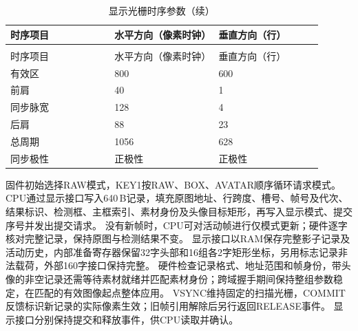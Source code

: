 \begin{reporttable}
\begin{longtable}{@{}p{0.30\linewidth}p{0.30\linewidth}p{0.30\linewidth}@{}}
\caption{显示光栅时序参数}\label{tbl:video-output-timing}\\
\toprule
时序项目 & 水平方向（像素时钟） & 垂直方向（行） \\
\midrule
\endfirsthead
\caption[]{显示光栅时序参数（续）}\\
\toprule
时序项目 & 水平方向（像素时钟） & 垂直方向（行） \\
\midrule
\endhead
\bottomrule
\endfoot
有效区 & 800 & 600 \\
前肩 & 40 & 1 \\
同步脉宽 & 128 & 4 \\
后肩 & 88 & 23 \\
总周期 & 1056 & 628 \\
同步极性 & 正极性 & 正极性 \\
\end{longtable}
\end{reporttable}

固件初始选择RAW模式，KEY1按RAW、BOX、AVATAR顺序循环请求模式。
CPU通过显示接口写入640\,B记录，填充原图地址、行跨度、槽号、帧号及代次、结果标识、检测框、主框索引、素材身份及头像目标矩形，再写入显示模式、提交序号并发出提交请求。
没有新帧时，CPU可对活动帧进行仅模式更新；硬件逐字核对完整记录，保持原图与检测结果不变。
显示接口以RAM保存完整影子记录及活动历史，内部准备寄存器保留32字头部和16组各2字矩形坐标，另用标志记录非法载荷，外部160字接口保持完整。
硬件检查记录格式、地址范围和帧身份，带头像的非空记录还需等待素材就绪并匹配素材身份；跨域握手期间保持整组参数稳定，在匹配的有效图像起点整体应用。
VSYNC维持固定的扫描光栅，COMMIT反馈标识新记录的实际像素生效；旧帧引用解除后另行返回RELEASE事件。
显示接口分别保持提交和释放事件，供CPU读取并确认。
